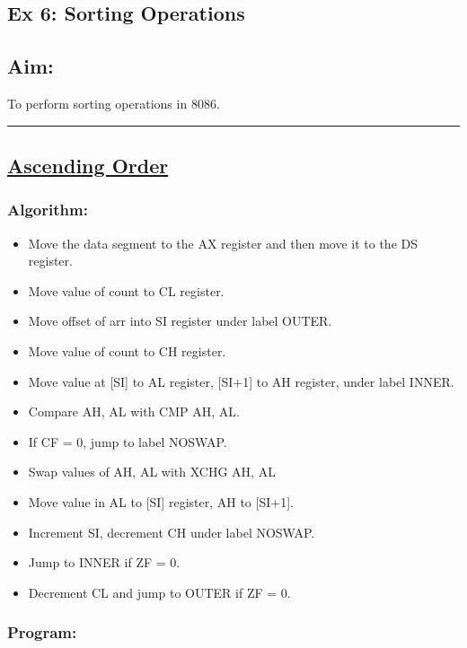 \documentclass[10pt,a4paper]{article}
\begin{document}
\begin{flushleft}
\section*{\textbf{Ex 6: Sorting Operations}}
\subsection*{\textbf{Aim:}} 
To perform sorting operations in 8086.

\vspace{1cm}
\hrule
\subsection*{\textbf{\underline{Ascending Order}}}

\subsubsection*{\textbf{Algorithm:}}
\begin{itemize}
    \item Move the data segment to the AX register and then move it to the DS register.
    \item Move value of count to CL register.
    \item Move offset of arr into SI register under label OUTER.
    \item Move value of count to CH register.
    \item Move value at [SI] to AL register, [SI+1] to AH register, under label INNER.
    \item Compare AH, AL with CMP AH, AL.
    \item If CF = 0, jump to label NOSWAP. 
    \item Swap values of AH, AL with XCHG AH, AL
    \item Move value in AL to [SI] register, AH to [SI+1].
    \item Increment SI, decrement CH under label NOSWAP.
    \item Jump to INNER if ZF = 0.
    \item Decrement CL and jump to OUTER if ZF = 0.
\end{itemize}

\newpage
\subsubsection*{\textbf{Program:}}


\end{flushleft}
\end{document}
